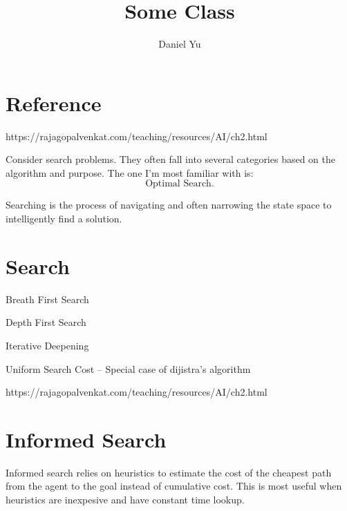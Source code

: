 \documentclass[a4paper]{article}
\title{\Huge{Some Class}}
\author{\huge{Daniel Yu}}
\date{}
\begin{document}
\maketitle
\newpage%
\tableofcontents
\pagebreak

\section{Reference}
https://rajagopalvenkat.com/teaching/resources/AI/ch2.html

Consider search problems. They often fall into several categories based on the algorithm and purpose. The one I'm most familiar with is: 
\[
  \text{Optimal Search}
.\] 

\begin{definition}
  Searching is the process of navigating and often narrowing the state space to intelligently find a solution.
\end{definition}

\section{Search}
\begin{enum}
  \item Breath First Search
  \item Depth First Search
  \item Iterative Deepening
  \item Uniform Search Cost -- Special case of dijistra's algorithm
\end{enum}

https://rajagopalvenkat.com/teaching/resources/AI/ch2.html

\section{Informed Search}
\begin{definition}
  Informed search relies on heuristics to estimate the cost of the cheapest path from the agent to the goal instead of cumulative cost. This is most useful when
  heuristics are inexpesive and have constant time lookup.
\end{definition}
\end{document}
